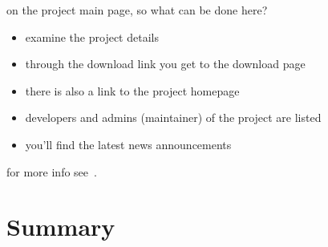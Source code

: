 on the project main page, so what can be done here?

\begin{itemize}

\item examine the project details

\item through the download link you get to the download page

\item there is also a link to the project homepage

\item developers and admins (maintainer) of the project are listed 

\item you'll find the latest news announcements

\end{itemize}


for more info see~\cite{theussl07:r_forge_users_manual}.

\section*{Summary}


